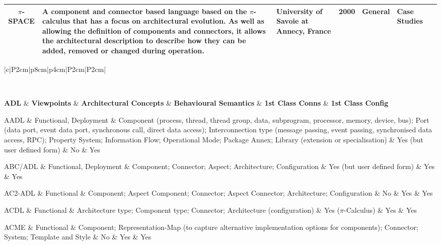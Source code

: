 \begin{landscape}
\begin{longtable}{|c|p{6cm}|p{3cm}|c|p{3cm}|p{2cm}|c|}
\hline
$\pi$-SPACE & A component and connector based language based on the $\pi$-calculus that has a focus on architectural evolution. As well as allowing the definition of components and connectors, it allows the architectural description to describe how they can be added, removed or changed during operation. & University of Savoie at Annecy, France & 2000 & General & Case Studies & \cite{chaudet2000-pispace} \\
\hline

\end{longtable}
\end{landscape}

\begin{landscape}
\footnotesize
\begin{longtable}{|c|P{2cm}|p{8cm}|p{4cm}|P{2cm}|P{2cm}|} 
\label{table:adl-concepts} \\
\caption{ADL Support for Architectural Concepts} \\
\hline

\textbf{ADL} & \textbf{Viewpoints} & \textbf{Architectural Concepts} & \textbf{ Behavioural Semantics} & \textbf{1st Class Conns} & \textbf{1st Class Config} 
\endhead
\hline

AADL & Functional, Deployment & Component (process, thread, thread group, data, subprogram, processor, memory, device, bus); Port (data port, event data port, synchronous call, direct data access); Interconnection type (message passing, event passing, synchronised data access, RPC); Property System; Information Flow; Operational Mode; Package Annex; Library (extension or specialisation) & Yes (but user defined form) & No & Yes \\
\hline

ABC/ADL & Functional, Deployment & Component; Connector; Aspect; Architecture; Configuration & Yes (but user defined form) & Yes & Yes \\
\hline

AC2-ADL & Functional & Component; Aspect Component; Connector; Aspect Connector; Architecture; Configuration & No & Yes & Yes \\

\hline

ACDL & Functional & Architecture type; Component type; Connector; Architecture (configuration) & Yes ($\pi$-Calculus) & Yes & Yes \\ 
\hline

ACME & Functional & Component; Representation-Map (to capture alternative implementation options for components); Connector; System; Template and Style & No & Yes & Yes \\ 
\hline


\end{longtable}
\end{landscape}
